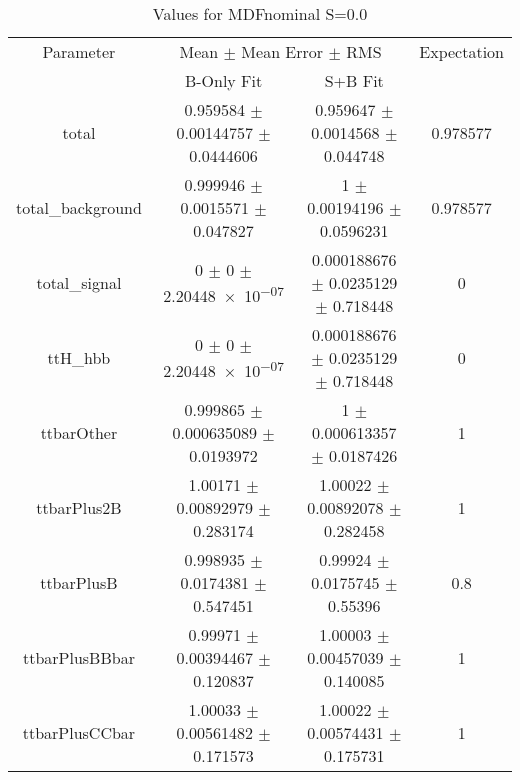 \begin{table}
\centering
\caption{Values for MDFnominal S=0.0}
\begin{tabular}{cccc}
\toprule
Parameter & \multicolumn{2}{c}{Mean $\pm$ Mean Error $\pm$ RMS} & Expectation\\
 & B-Only Fit & S+B Fit & \\
\midrule
total & \num{0.959584} $\pm$ \num{0.00144757} $\pm$ \num{0.0444606} & \num{0.959647} $\pm$ \num{0.0014568} $\pm$ \num{0.044748} & \num{0.978577}\\
total\_background & \num{0.999946} $\pm$ \num{0.0015571} $\pm$ \num{0.047827} & \num{1} $\pm$ \num{0.00194196} $\pm$ \num{0.0596231} & \num{0.978577}\\
total\_signal & \num{0} $\pm$ \num{0} $\pm$ \num{2.20448e-07} & \num{0.000188676} $\pm$ \num{0.0235129} $\pm$ \num{0.718448} & \num{0}\\
ttH\_hbb & \num{0} $\pm$ \num{0} $\pm$ \num{2.20448e-07} & \num{0.000188676} $\pm$ \num{0.0235129} $\pm$ \num{0.718448} & \num{0}\\
ttbarOther & \num{0.999865} $\pm$ \num{0.000635089} $\pm$ \num{0.0193972} & \num{1} $\pm$ \num{0.000613357} $\pm$ \num{0.0187426} & \num{1}\\
ttbarPlus2B & \num{1.00171} $\pm$ \num{0.00892979} $\pm$ \num{0.283174} & \num{1.00022} $\pm$ \num{0.00892078} $\pm$ \num{0.282458} & \num{1}\\
ttbarPlusB & \num{0.998935} $\pm$ \num{0.0174381} $\pm$ \num{0.547451} & \num{0.99924} $\pm$ \num{0.0175745} $\pm$ \num{0.55396} & \num{0.8}\\
ttbarPlusBBbar & \num{0.99971} $\pm$ \num{0.00394467} $\pm$ \num{0.120837} & \num{1.00003} $\pm$ \num{0.00457039} $\pm$ \num{0.140085} & \num{1}\\
ttbarPlusCCbar & \num{1.00033} $\pm$ \num{0.00561482} $\pm$ \num{0.171573} & \num{1.00022} $\pm$ \num{0.00574431} $\pm$ \num{0.175731} & \num{1}\\
\bottomrule
\end{tabular}
\end{table}